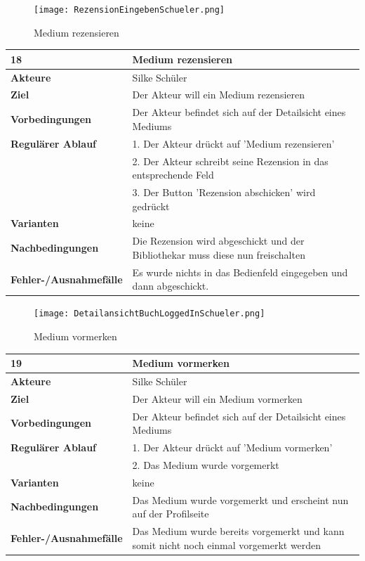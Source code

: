 \documentclass[fontsize=12pt,paper=a4,twoside]{scrartcl}
\begin{document}
\begin{figure}
	[H] \caption{Medium rezensieren} 
	\texttt{[image: RezensionEingebenSchueler.png]} \label{pic:MedRezension} 
\end{figure}
\begin{table}
	[H] \label{18} 
	\begin{tabular}
		{|l|p{10cm}|} \hline \textbf{18} & \textbf{Medium rezensieren} \\
		\hline \textbf{Akteure} & Silke Schüler\\
		\hline \textbf{Ziel} & Der Akteur will ein Medium rezensieren \\
		\hline \textbf{Vorbedingungen} & Der Akteur befindet sich auf der Detailsicht eines Mediums \\
		\hline \textbf{Regulärer Ablauf} & 1. Der Akteur drückt auf 'Medium rezensieren' \\
		&2. Der Akteur schreibt seine Rezension in das entsprechende Feld\\
		&3. Der Button 'Rezension abschicken' wird gedrückt\\
		\hline \textbf{Varianten} & keine \\
		\hline \textbf{Nachbedingungen} & Die Rezension wird abgeschickt und der Bibliothekar muss diese nun freischalten\\
		\hline \textbf{Fehler-/Ausnahmefälle} & Es wurde nichts in das Bedienfeld eingegeben und dann abgeschickt.\\
		\hline 
	\end{tabular}
\end{table}
\begin{figure}
	[H] \caption{Medium vormerken} 
	\texttt{[image: DetailansichtBuchLoggedInSchueler.png]} \label{pic:MedVormerken} 
\end{figure}
\begin{table}
	[H] \label{19} 
	\begin{tabular}
		{|l|p{10cm}|} \hline \textbf{19} & \textbf{Medium vormerken} \\
		\hline \textbf{Akteure} & Silke Schüler\\
		\hline \textbf{Ziel} & Der Akteur will ein Medium vormerken \\
		\hline \textbf{Vorbedingungen} & Der Akteur befindet sich auf der Detailsicht eines Mediums \\
		\hline \textbf{Regulärer Ablauf} & 1. Der Akteur drückt auf 'Medium vormerken' \\
		&2. Das Medium wurde vorgemerkt\\
		\hline \textbf{Varianten} & keine \\
		\hline \textbf{Nachbedingungen} & Das Medium wurde vorgemerkt und erscheint nun auf der Profilseite\\
		\hline \textbf{Fehler-/Ausnahmefälle} & Das Medium wurde bereits vorgemerkt und kann somit nicht noch einmal vorgemerkt werden\\
		\hline 
	\end{tabular}
\end{table}
\end{document}
